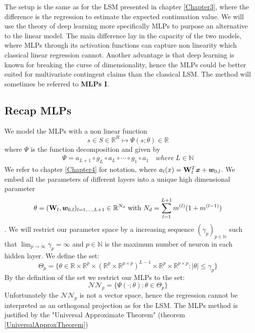 The setup is the same as for the LSM presented in chapter \ref{Chapter3}, where the difference is the regression to estimate the expected continuation value. We will use the theory of deep learning more specifically MLPs to purpose an alternative to the linear model. The main difference lay in the capacity of the two models, where MLPs through its activation functions can capture non linearity which classical linear regression cannot. Another advantage is that deep learning is known for breaking the curse of dimensionality, hence the MLPs could be better suited for multivariate contingent claims than the classical LSM. The method will sometimes be referred to \textbf{MLPs I}.

\subsection{Recap MLPs}
We model the MLPs with a non linear function 
$$s \in S \in \mathbb{R}^R \mapsto \Psi(s;\theta) \in \mathbb{R}$$
where $\Psi$ is the function decomposition and given by
\begin{align*}
\Psi = a_{L+1} \circ g_L \circ a_{L} \circ \cdots \circ g_1 \circ a_1 \quad where \ L\in \mathbb{N}
\end{align*}
We refer to chapter \ref{Chapter4} for notation, where $a_l(x)=\mathbf{W}_l^T \bm{x} + \bm{w}_{0,l}$. We embed all the parameters of different layers into a unique high dimensional parameter
$$\theta=(\mathbf{W}_l, \bm{w}_{0,l})_{l=1,\ldots,L+1} \in \mathbb{R}^{N_d} \text{ with } N_d=\sum_{l=1}^{L+1} m^{(l)} (1+ m^{(l-1)})$$. 
We will restrict our parameter space by a increasing sequence $(\gamma_p)_{p\in \mathbb{N}}$ such that $\lim_{p\to \infty} \gamma_p=\infty$ and $p\in \mathbb{N}$ is the maximum number of neuron in each hidden layer. We define the set:
$$\Theta_p = \{ \theta \in \mathbb{R} \times \mathbb{R}^p \times (\mathbb{R}^p \times \mathbb{R}^{p \times p})^{L-1} \times \mathbb{R}^{p} \times \mathbb{R}^{p \times p} : |\theta| \leq \gamma_p \}$$
By the definition of the set we restrict our MLPs to the set:
$$\mathcal{N} \mathcal{N}_p= \{ \Psi(\cdot;\theta) : \theta \in \Theta_p \}$$
Unfortunately the $\mathcal{N} \mathcal{N}_p$ is not a vector space, hence the regression cannot be interpreted as an orthogonal projection as for the LSM. The MLPs method is justified by the "Universal Approximate Theorem" (theorem \ref{UniversalApproxTheorem})

